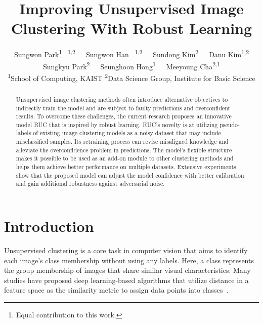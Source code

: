 \documentclass[final]{cvpr}
\newcommand{\model}{\textsf{RUC}}
\begin{document}
\title{Improving Unsupervised Image Clustering With Robust Learning}

\author{Sungwon Park\thanks{Equal contribution to this work.}\textsuperscript{\rm ~~1,2}~~~Sungwon Han\footnotemark[1]\textsuperscript{\rm ~~1,2}~~~Sundong Kim\textsuperscript{\rm 2}~~~Danu Kim\textsuperscript{\rm 1,2} \\ Sungkyu Park\textsuperscript{\rm 2}~~~Seunghoon Hong\textsuperscript{\rm 1}~~~Meeyoung Cha\textsuperscript{\rm 2,1} \\

\hspace*{\fill}
\textsuperscript{\rm 1}School of Computing, KAIST 
\hspace{0.6cm} \textsuperscript{\rm 2}Data Science Group, Institute for Basic Science
\hspace*{\fill} \\
}

 \maketitle
\thispagestyle{empty}
\pagestyle{empty}


\begin{abstract}
Unsupervised image clustering methods often introduce alternative objectives to indirectly train the model and are subject to faulty predictions and overconfident results. To overcome these challenges, the current research proposes an innovative model \model{} that is inspired by robust learning. \model{}'s novelty is at utilizing pseudo-labels of existing image clustering models as a noisy dataset that may include misclassified samples. Its retraining process can revise misaligned knowledge and alleviate the overconfidence problem in predictions. The model's flexible structure makes it possible to be used as an add-on module to other clustering methods and helps them achieve better performance on multiple datasets. Extensive experiments show that the proposed model can adjust the model confidence with better calibration and gain additional robustness against adversarial noise.
\end{abstract} \section{Introduction}
Unsupervised clustering is a core task in computer vision that aims to identify each image's class membership without using any labels. Here, a class represents the group membership of images that share similar visual characteristics. Many studies have proposed deep learning-based algorithms that utilize distance in a feature space as the similarity metric to assign data points into classes~\cite{ding2004k,vincent2010stacked}.
\end{document}
